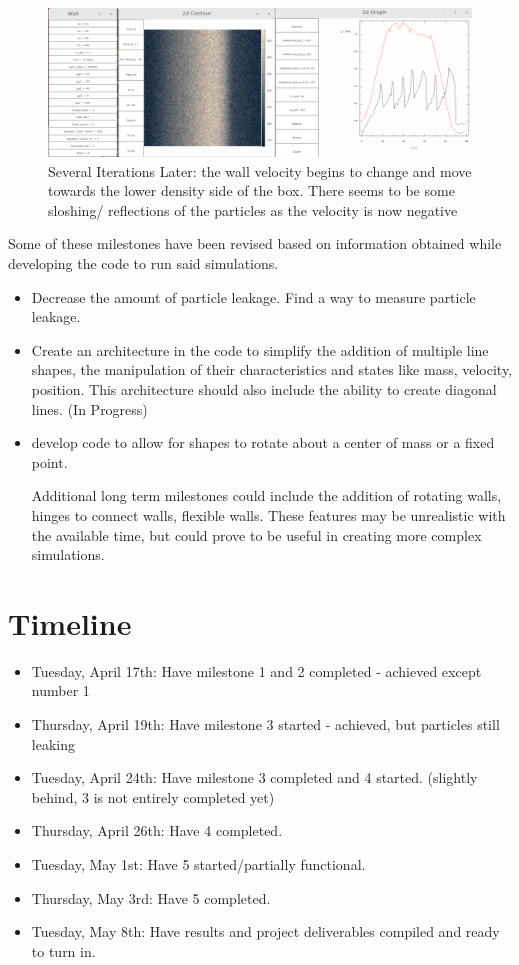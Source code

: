 \documentclass{article}
\begin{document}
\begin{itemize}
\begin{figure}

\includegraphics[scale=0.2]{ms2p1.png}
\caption{\label{fig} Several Iterations Later: the wall velocity begins to change and move towards the lower density side of the box. There seems to be some sloshing/ reflections of the particles as the velocity is now negative}
\end{figure} 

  
\end{itemize}
Some of these milestones have been revised based on information obtained while developing the code to run said simulations. 
\begin{itemize}
  
  \item Decrease the amount of particle leakage. Find a way to measure particle leakage.
  
  \item Create an architecture in the code to simplify the addition of multiple line shapes, the manipulation of their characteristics and states like mass, velocity, position. This architecture should also include the ability to create diagonal lines. (In Progress)
  
  \item develop code to allow for shapes to rotate about a center of mass or a fixed point.
  
 
Additional long term milestones could include the addition of rotating walls, hinges to connect walls, flexible walls. These features may be unrealistic with the available time, but could prove to be useful in creating more complex simulations.
\end{itemize}
\section{Timeline}
\begin{itemize}
  \item Tuesday, April 17th: Have milestone 1 and 2 completed - achieved except number 1
  \item Thursday, April 19th: Have milestone 3 started - achieved, but particles still leaking
  \item Tuesday, April 24th: Have milestone 3 completed and 4 started. (slightly behind, 3 is not entirely completed yet)
  \item Thursday, April 26th: Have 4 completed.
  \item Tuesday, May 1st: Have 5 started/partially functional.
  \item Thursday, May 3rd: Have 5 completed.
  \item Tuesday, May 8th: Have results and project deliverables compiled and ready to turn in.
\end{itemize}
\end{document}
